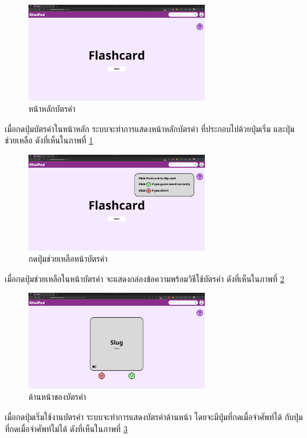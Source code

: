 \documentclass[12pt,oneside,openright,a4paper]{cpe-thai-project}
\begin{document}
\begin{figure}[!h]\centering
	\includegraphics[width=0.7\textwidth, keepaspectratio=true]{image/chap4/UI/flashcard/flashcard.png}
	\caption{{หน้าหลักบัตรคำ}}\label{fig:chap4UIFlash}
\end{figure}
\hspace{1cm}
เมื่อกดปุ่มบัตรคำในหน้าหลัก ระบบจะทำการแสดงหน้าหลักบัตรคำ ที่ประกอบไปด้วยปุ่มเริ่ม และปุ่มช่วยเหลือ
ดังที่เห็นในภาพที่ \ref{fig:chap4UIFlash}

\pagebreak
\begin{figure}[!h]\centering
	\includegraphics[width=0.7\textwidth, keepaspectratio=true]{image/chap4/UI/flashcard/flashcard help.png}
	\caption{{กดปุ่มช่วยเหลือหน้าบัตรคำ}}\label{fig:chap4UIFlashHelp}
\end{figure}
\hspace{1cm}
เมื่อกดปุ่มช่วยเหลือในหน้าบัตรคำ จะแสดงกล่องข้อความพร้อมวิธีใช้บัตรคำ ดังที่เห็นในภาพที่ \ref{fig:chap4UIFlashHelp}

\begin{figure}[!h]\centering
	\includegraphics[width=0.7\textwidth, keepaspectratio=true]{image/chap4/UI/flashcard/front.png}
	\caption{{ด้านหน้าของบัตรคำ}}\label{fig:chap4UIFlashFront}
\end{figure}
\hspace{1cm}
เมื่อกดปุ่มเริ่มใช้งานบัตรคำ ระบบจะทำการแสดงบัตรคำด้านหน้า โดยจะมีปุ่มที่กดเมื่อจำศัพท์ได้ กับปุ่มที่กดเมื่อจำศัพท์ไม่ได้
ดังที่เห็นในภาพที่ \ref{fig:chap4UIFlashFront}
\end{document}
